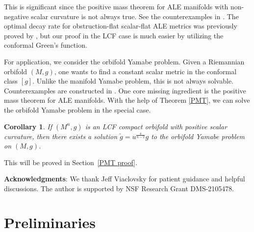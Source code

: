 \documentclass[12pt]{amsart}
\newtheorem{corollary}[theorem]{Corollary}
\theoremstyle{definition}
\begin{document}
This is significant since the positive mass theorem for ALE manifolds with non-negative scalar curvature is not always true. See the counterexamples in \cite{Lebrun}. 
The optimal decay rate for obstruction-flat scalar-flat ALE metrics was previously proved by \cite{AcheViaclovsky}, but our proof in the LCF case is much easier by utilizing the conformal Green's function. 


For application, we consider the orbifold Yamabe problem. Given a Riemannian orbifold $(M,g)$, one wants to find a constant scalar metric in the conformal class $[g]$. Unlike the manifold Yamabe problem, this is not always solvable. Counterexamples are constructed in \cite{viaclovsky2010monopole}. One core missing ingredient is the positive mass theorem for ALE manifolds. With the help of Theorem \ref{PMT}, we can solve the orbifold Yamabe problem in the special case.
\begin{corollary}\label{orbifold Yamabe corollary}
If $(M^n,g)$ is an LCF compact orbifold with positive scalar curvature, 
then there exists a solution $\tilde{g} = u^\frac{4}{n-2} g$ to the orbifold Yamabe problem on $(M,g)$. 
\end{corollary}
This will be proved in Section~\ref{PMT proof}.




 \textbf{Acknowledgments}: We thank Jeff Viaclovsky for patient guidance and helpful discussions. The author is supported by NSF Research Grant DMS-2105478. 






\section{Preliminaries}
\end{document}
